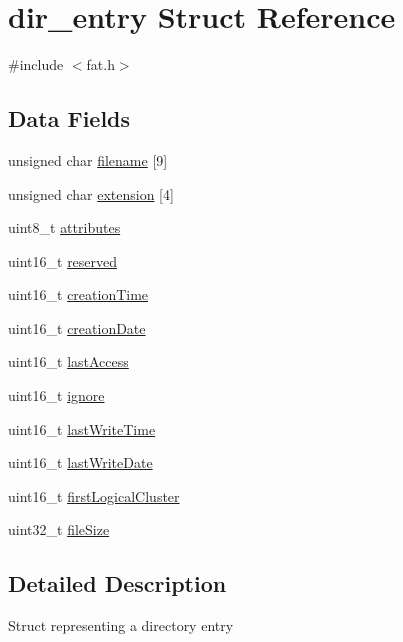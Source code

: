 \hypertarget{structdir__entry}{}\section{dir\+\_\+entry Struct Reference}
\label{structdir__entry}


{\ttfamily \#include $<$fat.\+h$>$}

\subsection*{Data Fields}
\begin{DoxyCompactItemize}
\item 
unsigned char \hyperlink{structdir__entry_aa45f4647093034458ab8972553e58829}{filename} \mbox{[}9\mbox{]}
\item 
unsigned char \hyperlink{structdir__entry_aa7a3c21c76cf5259f07096aa3cb7be7b}{extension} \mbox{[}4\mbox{]}
\item 
uint8\+\_\+t \hyperlink{structdir__entry_a983149395439fbc9ca8497076b75fd6b}{attributes}
\item 
uint16\+\_\+t \hyperlink{structdir__entry_a5a6ed8c04a3db86066924b1a1bf4dad3}{reserved}
\item 
uint16\+\_\+t \hyperlink{structdir__entry_a2b2b18a3fb988470278b1217abe946ab}{creation\+Time}
\item 
uint16\+\_\+t \hyperlink{structdir__entry_ab00be6268bf4c4f4b6014f056e27ba45}{creation\+Date}
\item 
uint16\+\_\+t \hyperlink{structdir__entry_a242e5c055f30cde4b8c0e121fe25deab}{last\+Access}
\item 
uint16\+\_\+t \hyperlink{structdir__entry_a56a1f4f280fba6da7541dbe629342781}{ignore}
\item 
uint16\+\_\+t \hyperlink{structdir__entry_ab140bb773b2ff0ddf7199efc083ce037}{last\+Write\+Time}
\item 
uint16\+\_\+t \hyperlink{structdir__entry_a26f462d6e4410d502149973ee6c216fd}{last\+Write\+Date}
\item 
uint16\+\_\+t \hyperlink{structdir__entry_a1b249a3e9b17eda2684039fc366f6131}{first\+Logical\+Cluster}
\item 
uint32\+\_\+t \hyperlink{structdir__entry_a48f46ad02b77a00b795d15626ba1d42e}{file\+Size}
\end{DoxyCompactItemize}


\subsection{Detailed Description}
Struct representing a directory entry 

